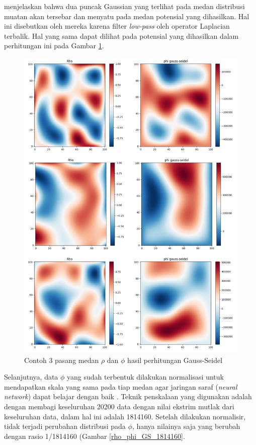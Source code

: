 \cite{cheng_illarramendi_bauerheim_cuenot_2021} menjelaskan bahwa dua puncak Gaussian yang terlihat pada medan distribusi muatan akan tersebar dan menyatu pada medan potensial yang dihasilkan. Hal ini disebutkan oleh mereka karena filter \textit{low-pass} oleh operator Laplacian terbalik. Hal yang sama dapat dilihat pada potensial yang dihasilkan dalam perhitungan ini pada Gambar \ref{rho_phi_GS}.

\begin{figure}[h!]
    \centering
    \includegraphics[width=12cm]{gambar/rho_phi_GS.png}
    \caption{Contoh 3 pasang medan $\rho$ dan $\phi$ hasil perhitungan Gauss-Seidel}
    \label{rho_phi_GS}
\end{figure}

Selanjutnya, data $\phi$ yang sudah terbentuk dilakukan normalisasi untuk mendapatkan skala yang sama pada tiap medan agar jaringan saraf (\textit{neural network}) dapat belajar dengan baik \citep{cheng_illarramendi_bauerheim_cuenot_2021}. Teknik penskalaan yang digunakan adalah dengan membagi keseluruhan 20200 data dengan nilai ekstrim mutlak dari keseluruhan data, dalam hal ini adalah 1814160. Setelah dilakukan normalisir, tidak terjadi perubahan distribusi pada $\phi$, hanya nilainya saja yang berubah dengan rasio 1/1814160 (Gambar \ref{rho_phi_GS_1814160}.

